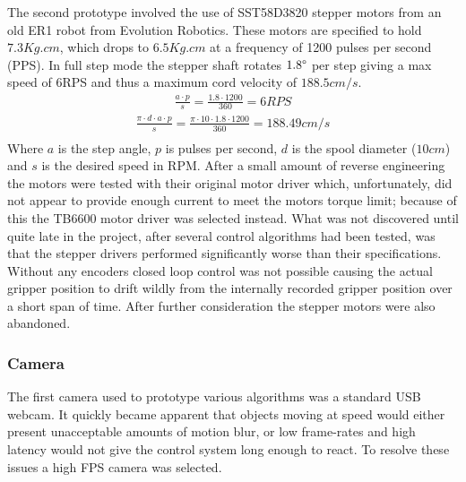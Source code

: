 \documentclass[conference]{IEEEtran}
\begin{document}
	The second prototype involved the use of SST58D3820 stepper motors from an old ER1 robot from Evolution Robotics. These motors are specified to hold $7.3Kg.cm$, which drops to $6.5Kg.cm$ at a frequency of 1200 pulses per second (PPS). In full step mode the stepper shaft rotates $1.8\degree$ per step giving a max speed of 6RPS and thus a maximum cord velocity of $188.5cm/s$. \begin{equation}
	\begin{aligned}
	\frac{a\cdot p}{s} = \frac{1.8\cdot 1200}{360} = 6 RPS
	\end{aligned}
	\end{equation}
	\begin{equation}
	\begin{aligned}
	\frac{\pi\cdot d\cdot a\cdot p}{s} = \frac{\pi \cdot 10 \cdot 1.8 \cdot 1200}{360} = 188.49 cm/s\\ 
	\end{aligned}
	\end{equation} Where $a$ is the step angle, $p$ is pulses per second, $d$ is the spool diameter ($10cm$) and $s$ is the desired speed in RPM. After a small amount of reverse engineering the motors were tested with their original motor driver which, unfortunately, did not appear to provide enough current to meet the motors torque limit; because of this the TB6600 motor driver was selected instead. What was not discovered until quite late in the project, after several control algorithms had been tested, was that the stepper drivers performed significantly worse than their specifications. Without any encoders closed loop control was not possible causing the actual gripper position to drift wildly from the internally recorded gripper position over a short span of time. After further consideration the stepper motors were also abandoned.
	
	
	
	\subsubsection{Camera}
	The first camera used to prototype various algorithms was a standard USB webcam. It quickly became apparent that objects moving at speed would either present unacceptable amounts of motion blur, or low frame-rates and high latency would not give the control system long enough to react. To resolve these issues  a high FPS camera was selected. 
	
\end{document}
